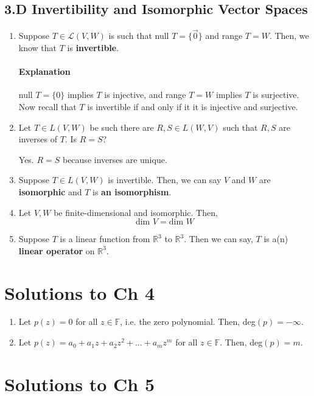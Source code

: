 \documentclass[11pt]{article}
\begin{document}
\subsection*{3.D Invertibility and Isomorphic Vector Spaces}
\begin{enumerate}
	\item Suppose $T \in \mathcal{L}(V, W)$ is such that null $T = \{\vec{0}\}$ and range $T = W$. Then, we know that $T$ is \textbf{invertible}.
	
	\paragraph{Explanation} null $T = \{0\}$ implies $T$ is injective, and range $T = W$ implies $T$ is surjective. Now recall that $T$ is invertible if and only if it it is injective and surjective.
	
	\item Let $T \in L(V, W)$ be such there are $R, S \in L(W, V)$ such that $R, S$ are inverses of $T$. Is $R = S$?
	
	\bigskip
	
	Yes. $R = S$ because inverses are unique.
	
	\item Suppose $T \in L(V, W)$ is invertible. Then, we can say $V$ and $W$ are \textbf{isomorphic} and $T$ is \textbf{an isomorphism}.
	
	\item Let $V, W$ be finite-dimensional and isomorphic. Then,
	\[ \text{dim } V = \text{dim } W\]
	
	\item Suppose $T$ is a linear function from $\mathbb{R}^3$ to $\mathbb{R}^3$. Then we can say, $T$ is a(n) \textbf{linear operator} on $\mathbb{R}^3$.
\end{enumerate}

\section*{Solutions to Ch 4}
\begin{enumerate}
	\item Let $p(z) = 0$ for all $z \in \mathbb{F}$, i.e. the zero polynomial. Then, deg$(p) = -\infty$.
	\item Let $p(z) = a_0 + a_1z + a_2z^2 + ... + a_mz^m$ for all $z \in \mathbb{F}$. Then, deg$(p) = m$.
\end{enumerate}

\section*{Solutions to Ch 5}
\end{document}
